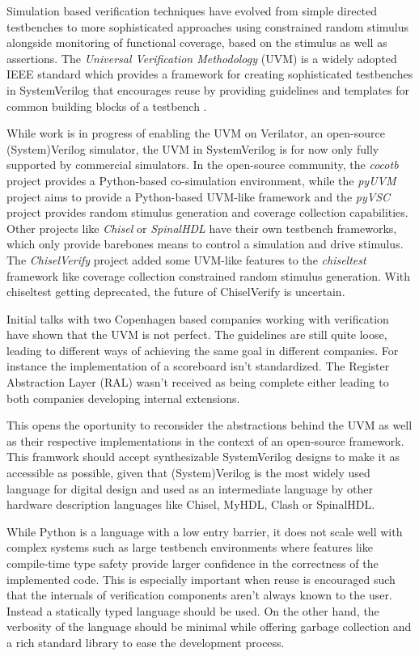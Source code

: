 \documentclass[11pt]{article}
\begin{document}
Simulation based verification techniques have evolved from simple directed testbenches to more sophisticated approaches using constrained random stimulus alongside monitoring of functional coverage, based on the stimulus as well as assertions. 
The \textit{Universal Verification Methodology} (UVM) is a widely adopted IEEE standard which provides a framework for creating sophisticated testbenches in SystemVerilog that encourages reuse by providing guidelines and templates for common building blocks of a testbench \cite{flake2020a}. 

While work is in progress of enabling the UVM on Verilator, an open-source (System)Verilog simulator, the UVM in SystemVerilog is for now only fully supported by commercial simulators.
In the open-source community, the \textit{cocotb} project provides a Python-based co-simulation environment, while the \textit{pyUVM} project aims to provide a Python-based UVM-like framework and the \textit{pyVSC} project provides random stimulus generation and coverage collection capabilities. Other projects like \textit{Chisel} or \textit{SpinalHDL} have their own testbench frameworks, which only provide barebones means to control a simulation and drive stimulus. The \textit{ChiselVerify} project added some UVM-like features to the \textit{chiseltest} framework like coverage collection constrained random stimulus generation. With chiseltest getting deprecated, the future of ChiselVerify is uncertain.

Initial talks with two Copenhagen based companies working with verification have shown that the UVM is not perfect. The guidelines are still quite loose, leading to different ways of achieving the same goal in different companies. For instance the implementation of a scoreboard isn't standardized. The Register Abstraction Layer (RAL) wasn't received as being complete either leading to both companies developing internal extensions.

This opens the oportunity to reconsider the abstractions behind the UVM as well as their respective implementations in the context of an open-source framework. This framwork should accept synthesizable SystemVerilog designs to make it as accessible as possible, given that (System)Verilog is the most widely used language for digital design and used as an intermediate language by other hardware description languages like Chisel, MyHDL, Clash or SpinalHDL.

While Python is a language with a low entry barrier, it does not scale well with complex systems such as large testbench environments where features like compile-time type safety provide larger confidence in the correctness of the implemented code. This is especially important when reuse is encouraged such that the internals of verification components aren't always known to the user. Instead a statically typed language should be used. On the other hand, the verbosity of the language should be minimal while offering garbage collection and a rich standard library to ease the development process. 
\end{document}
